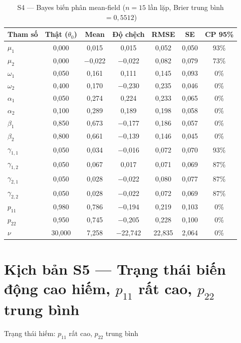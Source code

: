 \documentclass[11pt,a4paper]{article}
\begin{document}
\begin{table}[H]\centering\scriptsize
\caption{S4 --- Bayes biến phân mean-field ($n=15$ lần lặp, Brier trung bình $=0{,}5512$)}
\begin{tabularx}{\textwidth}{l C C C C C C}
\toprule
\textbf{Tham số} & \textbf{Thật ($\theta_0$)} & \textbf{Mean} & \textbf{Độ chệch} & \textbf{RMSE} & \textbf{SE} & \textbf{CP 95\%} \\
\midrule
$\mu_1$ & 0{,}000 & 0{,}015 & 0{,}015 & 0{,}052 & 0{,}050 & 93\% \\
$\mu_2$ & 0{,}000 & $-$0{,}022 & $-$0{,}022 & 0{,}082 & 0{,}079 & 73\% \\
$\omega_1$ & 0{,}050 & 0{,}161 & 0{,}111 & 0{,}145 & 0{,}093 & 0\% \\
$\omega_2$ & 0{,}400 & 0{,}170 & $-$0{,}230 & 0{,}235 & 0{,}046 & 0\% \\
$\alpha_1$ & 0{,}050 & 0{,}274 & 0{,}224 & 0{,}233 & 0{,}065 & 0\% \\
$\alpha_2$ & 0{,}100 & 0{,}289 & 0{,}189 & 0{,}198 & 0{,}058 & 0\% \\
$\beta_1$ & 0{,}850 & 0{,}673 & $-$0{,}177 & 0{,}186 & 0{,}057 & 0\% \\
$\beta_2$ & 0{,}800 & 0{,}661 & $-$0{,}139 & 0{,}146 & 0{,}045 & 0\% \\
$\gamma_{1,1}$ & 0{,}050 & 0{,}034 & $-$0{,}016 & 0{,}072 & 0{,}070 & 93\% \\
$\gamma_{1,2}$ & 0{,}050 & 0{,}067 & 0{,}017 & 0{,}071 & 0{,}069 & 87\% \\
$\gamma_{2,1}$ & 0{,}050 & 0{,}028 & $-$0{,}022 & 0{,}080 & 0{,}077 & 87\% \\
$\gamma_{2,2}$ & 0{,}050 & 0{,}028 & $-$0{,}022 & 0{,}072 & 0{,}069 & 87\% \\
$p_{11}$ & 0{,}980 & 0{,}786 & $-$0{,}194 & 0{,}219 & 0{,}103 & 0\% \\
$p_{22}$ & 0{,}950 & 0{,}745 & $-$0{,}205 & 0{,}228 & 0{,}100 & 0\% \\
$\nu$ & 30{,}000 & 7{,}258 & $-$22{,}742 & 22{,}835 & 2{,}064 & 0\% \\
\bottomrule
\end{tabularx}
\end{table}

\bigskip
\section*{Kịch bản S5 --- Trạng thái biến động cao hiếm, $p_{11}$ rất cao, $p_{22}$ trung bình}
Trạng thái hiếm: $p_{11}$ rất cao, $p_{22}$ trung bình
\end{document}
